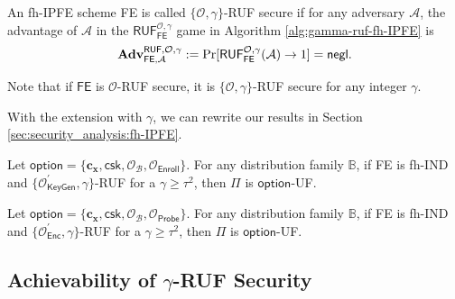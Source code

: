 \begin{definition}

	An fh-IPFE scheme \textsf{FE} is called $\{ \mathcal{O}, \gamma \}$-RUF secure if for any adversary $\mathcal{A}$, the advantage of $\mathcal{A}$ in the $\textsf{RUF}^{\mathcal{O}, \gamma}_\textsf{FE}$ game in Algorithm \ref{alg:gamma-ruf-fh-IPFE} is
\[
	\mathbf{Adv}_{\textsf{FE}, \mathcal{A}}^{\textsf{RUF}, \mathcal{O}, \gamma} := \Pr[\textsf{RUF}^{\mathcal{O}, \gamma}_{\textsf{FE}}(\mathcal{A}) \to 1 ] = \mathsf{negl}.
\]

\noindent Note that if $\textsf{FE}$ is $\mathcal{O}$-RUF secure, it is $\{ \mathcal{O}, \gamma \}$-RUF secure for any integer $\gamma$.
\end{definition}

With the extension with $\gamma$, we can rewrite our results in Section \ref{sec:security_analysis:fh-IPFE}.


\begin{theorem}
\label{thm:fh-IPFE:ind-gamma-ruf-OB-Enroll}
	Let $\textsf{option} = \{ \mathbf{c_x}, \textsf{csk}, \mathcal{O}_\mathcal{B}, \mathcal{O}_{\textsf{Enroll}} \}$. For any distribution family $\mathbb{B}$, if \textsf{FE} is fh-IND and $\{ \mathcal{O}^\prime_{\textsf{KeyGen}}, \gamma \}$-RUF for a $\gamma \geq \tau^2$, then $\Pi$ is $\textsf{option}$-UF. 
\end{theorem}

\begin{theorem}
\label{thm:fh-IPFE:ind-gamma-ruf-OB-Probe}
	Let $\textsf{option} = \{\mathbf{c_x}, \textsf{csk}, \mathcal{O}_\mathcal{B}, \mathcal{O}_\textsf{Probe}\}$. For any distribution family $\mathbb{B}$, if \textsf{FE} is fh-IND and $\{ \mathcal{O}^\prime_{\textsf{Enc}}, \gamma \}$-RUF for a $\gamma \geq \tau^2$, then $\Pi$ is $\textsf{option}$-UF. 
\end{theorem}

\subsection{Achievability of $\gamma$-RUF Security}


